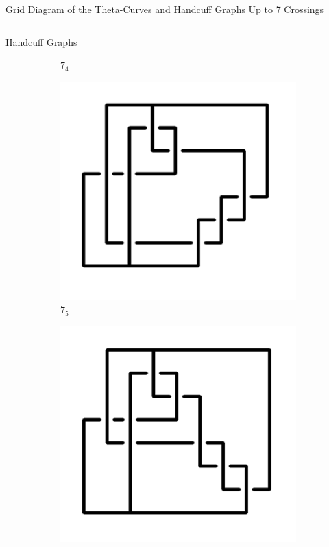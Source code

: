 \documentclass[final]{beamer}
\begin{document}
\begin{frame}[t]
\begin{alertblock}{Grid Diagram of the Theta-Curves and Handcuff Graphs Up to 7 Crossings}
\begin{columns}[t]
\begin{column}{0.5\textwidth}
\begin{alertblock}{Handcuff Graphs}
\begin{figure}
\begin{subfigure}{0.075\textwidth}
    \caption{$7_{4}$} 
    \end{subfigure}
    \begin{subfigure}{0.075\textwidth}
    \includegraphics[width=\columnwidth]{../Midterm_Poster/grid_diagram/handcuff_7_5.png}
    \caption{$7_{5}$} 
    \end{subfigure}
    \begin{subfigure}{0.075\textwidth}
    \includegraphics[width=\columnwidth]{../Midterm_Poster/grid_diagram/handcuff_7_6.png}

\end{subfigure}
\end{figure}
\end{alertblock}
\end{column}
\end{columns}
\end{alertblock}
\end{frame}
\end{document}
